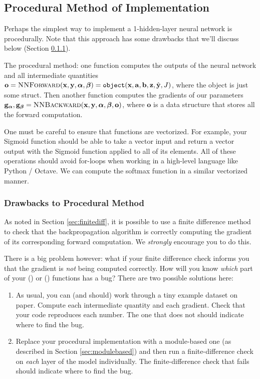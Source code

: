 \documentclass[11pt]{exam}
\numberwithin{equation}{section} %
\numberwithin{figure}{section} %
\numberwithin{table}{section} %
\newcommand{\av}{\mathbf{a}}
\newcommand{\bv}{\mathbf{b}}
\newcommand{\gv}{\mathbf{g}}
\newcommand{\ov}{\mathbf{o}}
\newcommand{\xv}{\mathbf{x}}
\newcommand{\yv}{\mathbf{y}}
\newcommand{\zv}{\mathbf{z}}
\newcommand{\alphav     }{\boldsymbol \alpha     }
\newcommand{\betav      }{\boldsymbol \beta      }
\begin{document}
\subsection{Procedural Method of Implementation}
\label{sec:procedural}

Perhaps the simplest way to implement a 1-hidden-layer neural network is procedurally. Note that this approach has some drawbacks that we'll discuss below (Section \ref{sec:proceduraldrawbacks}). 

The procedural method: one function computes the outputs of the neural network and all intermediate quantities $\ov = \textproc{NNForward}(\xv, \yv, \alphav, \betav) = \texttt{object}( \xv, \av, \bv, \zv, \hat{\yv}, J)$, where the object is just some struct. Then another function computes the gradients of our parameters $\gv_{\alphav}, \gv_{\betav} = \textproc{NNBackward}(\xv, \yv, \alphav, \betav, \ov)$, where $\ov$ is a data structure that stores all the forward computation.

One must be careful to ensure that functions are vectorized. For example, your Sigmoid function should be able to take a vector input and return a vector output with the Sigmoid function applied to all of its elements. All of these operations should avoid for-loops when working in a high-level language like Python / Octave. We can compute the softmax function in a similar vectorized manner.

\subsubsection{Drawbacks to Procedural Method}
\label{sec:proceduraldrawbacks}

As noted in Section \ref{sec:finitediff}, it is possible to use a finite difference method to check that the backpropagation algorithm is correctly computing the gradient of its corresponding forward computation. We \emph{strongly} encourage you to do this.

There is a big problem however: what if your finite difference check informs you that the gradient is \emph{not} being computed correctly. How will you know \emph{which} part of your () or () functions has a bug? There are two possible solutions here:
\begin{enumerate}
    \item As usual, you can (and should) work through a tiny example dataset on paper. Compute each intermediate quantity and each gradient. Check that your code reproduces each number. The one that does not should indicate where to find the bug.
    \item Replace your procedural implementation with a module-based one (as described in Section \ref{sec:modulebased}) and then run a finite-difference check on \emph{each} layer of the model individually. The finite-difference check that fails should indicate where to find the bug.
\end{enumerate}
\end{document}
